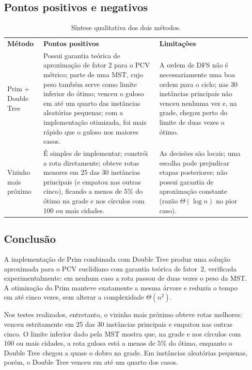 \documentclass[11pt,a4paper]{article}
\newcommand{\cab}[1]{\leavevmode\color{white}\bfseries #1}
\newcommand{\fioCabecalho}{\arrayrulecolor{tabFio}\specialrule{1.2pt}{0pt}{0pt}\arrayrulecolor{eachTeal}}
\renewcommand{\_}{\underscoreoriginal\allowbreak}
\begin{document}
\subsection{Pontos positivos e negativos}

\begin{table}[H]
\centering
{}
\begin{tabularx}{\textwidth}{>{\raggedright\arraybackslash}p{2.7cm}XX}
\toprule
\rowcolor{tabCabecalho}
\cab{Método} & \cab{Pontos positivos} & \cab{Limitações}\\
\fioCabecalho
Prim + Double Tree &
Possui garantia teórica de aproximação de fator 2 para o PCV métrico; parte de uma MST, cujo peso também serve como limite inferior do ótimo; venceu o guloso em até um quarto das instâncias aleatórias pequenas; com a implementação otimizada, foi mais rápido que o guloso nos maiores casos. &
A ordem de DFS não é necessariamente uma boa ordem para o ciclo; nas 30 instâncias principais não venceu nenhuma vez e, na grade, chegou perto do limite de duas vezes o ótimo.\\
\midrule
Vizinho mais próximo &
É simples de implementar; constrói a rota diretamente; obteve rotas menores em 25 das 30 instâncias principais (e empatou nas outras cinco), ficando a menos de $5\%$ do ótimo na grade e nos círculos com 100 ou mais cidades. &
As decisões são locais; uma escolha pode prejudicar etapas posteriores; não possui garantia de aproximação constante (razão $\Theta(\log n)$ no pior caso).\\
\bottomrule
\end{tabularx}
\caption{Síntese qualitativa dos dois métodos.}
\label{tab:qualitativa}
\end{table}

\subsection{Conclusão}

A implementação de Prim combinada com Double Tree produz uma solução
aproximada para o PCV euclidiano com garantia teórica de fator~2,
verificada experimentalmente: em nenhum caso a rota passou de duas
vezes o peso da MST. A otimização do Prim manteve exatamente a mesma
árvore e reduziu o tempo em até cinco vezes, sem alterar a complexidade
$\Theta(n^2)$.

Nos testes realizados, entretanto, o vizinho mais próximo obteve rotas
melhores: venceu estritamente em 25 das 30 instâncias principais e
empatou nas outras cinco. O limite inferior dado pela MST mostra que, na
grade e nos círculos com 100 ou mais cidades, a rota gulosa está a
menos de $5\%$ do ótimo, enquanto o Double Tree chegou a quase o dobro
na grade. Em
instâncias aleatórias pequenas, porém, o Double Tree venceu em até um
quarto dos casos.
\end{document}
